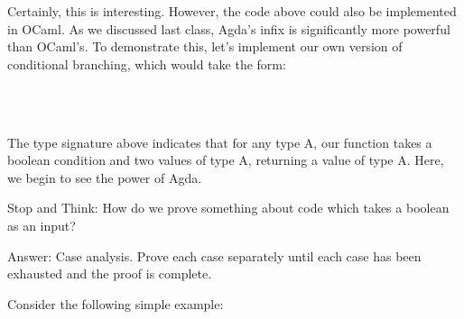 \documentclass{lecturenotes}
\begin{document}
Certainly, this is interesting. However, the code above could also be implemented in OCaml.
As we discussed last class, Agda's infix is significantly more powerful than OCaml's.
To demonstrate this, let's implement our own version of conditional branching, which would take the form:

\begin{center}
    \begin{code}%
%
\>[8]\AgdaSpace{}%
\AgdaSymbol{:}\AgdaSpace{}%
\AgdaSpace{}%
\AgdaSymbol{\{}\AgdaSpace{}%
\AgdaSymbol{:}\AgdaSpace{}%
\AgdaSymbol{\}}\AgdaSpace{}%
\AgdaSymbol{->}\AgdaSpace{}%
\AgdaSpace{}%
\AgdaSymbol{->}\AgdaSpace{}%
\AgdaSpace{}%
\AgdaSymbol{->}\AgdaSpace{}%
\AgdaSpace{}%
\AgdaSymbol{->}\AgdaSpace{}%
\<%
\\
%
\>[8]\AgdaSpace{}%
\AgdaSpace{}%
\AgdaSpace{}%
\AgdaSpace{}%
\AgdaSpace{}%
\AgdaSpace{}%
\AgdaSymbol{=}\AgdaSpace{}%
\<%
\\
%
\>[8]\AgdaSpace{}%
\AgdaSpace{}%
\AgdaSpace{}%
\AgdaSpace{}%
\AgdaSpace{}%
\AgdaSpace{}%
\AgdaSymbol{=}\AgdaSpace{}%
\<%
\end{code}
\end{center}

\pagebreak

The type signature above indicates that for any type A, our function takes a boolean condition and two values of type A, returning a value of type A.
Here, we begin to see the power of Agda.

\vspace{0.2in}

\noindent Stop and Think: How do we prove something about code which takes a boolean as an input?

\noindent Answer: Case analysis. Prove each case separately until each case has been exhausted and the proof is complete. 

\vspace{0.2in}

Consider the following simple example:
\end{document}

